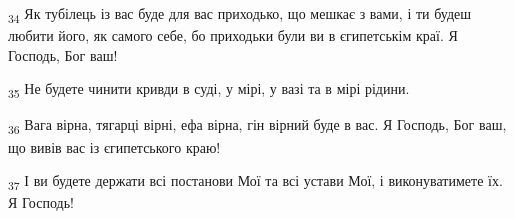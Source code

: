 \begin{tcolorbox}
\textsubscript{34} Як тубілець із вас буде для вас приходько, що мешкає з вами, і ти будеш любити його, як самого себе, бо приходьки були ви в єгипетськім краї. Я Господь, Бог ваш!
\end{tcolorbox}
\begin{tcolorbox}
\textsubscript{35} Не будете чинити кривди в суді, у мірі, у вазі та в мірі рідини.
\end{tcolorbox}
\begin{tcolorbox}
\textsubscript{36} Вага вірна, тягарці вірні, ефа вірна, гін вірний буде в вас. Я Господь, Бог ваш, що вивів вас із єгипетського краю!
\end{tcolorbox}
\begin{tcolorbox}
\textsubscript{37} І ви будете держати всі постанови Мої та всі устави Мої, і виконуватимете їх. Я Господь!
\end{tcolorbox}
